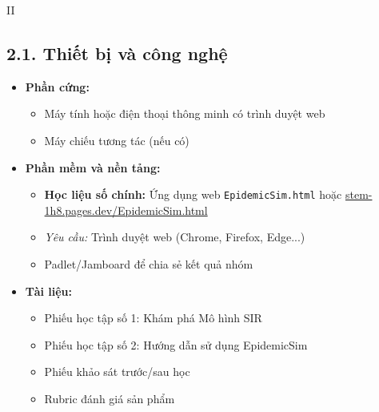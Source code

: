 \documentclass[12pt,a4paper]{article}
\begin{document}
\begin{competitionsection}{II}
\vspace{0.5cm}
\subsection*{2.1. Thiết bị và công nghệ}
\begin{itemize}[leftmargin=*,noitemsep]
\item \textbf{Phần cứng:}
    \begin{itemize}
    \item Máy tính hoặc điện thoại thông minh có trình duyệt web
    \item Máy chiếu tương tác (nếu có)
    \end{itemize}
\item \textbf{Phần mềm và nền tảng:}
    \begin{itemize}
    \item \textbf{Học liệu số chính:} Ứng dụng web \texttt{EpidemicSim.html} hoặc \href{https://stem-1h8.pages.dev/EpidemicSim.html}{stem-1h8.pages.dev/EpidemicSim.html}
    \item \textit{Yêu cầu:} Trình duyệt web (Chrome, Firefox, Edge...)
    \item Padlet/Jamboard để chia sẻ kết quả nhóm
    \end{itemize}
\item \textbf{Tài liệu:}
    \begin{itemize}
    \item Phiếu học tập số 1: Khám phá Mô hình SIR
    \item Phiếu học tập số 2: Hướng dẫn sử dụng EpidemicSim
    \item Phiếu khảo sát trước/sau học
    \item Rubric đánh giá sản phẩm
    \end{itemize}
\end{itemize}


\end{competitionsection}
\end{document}
